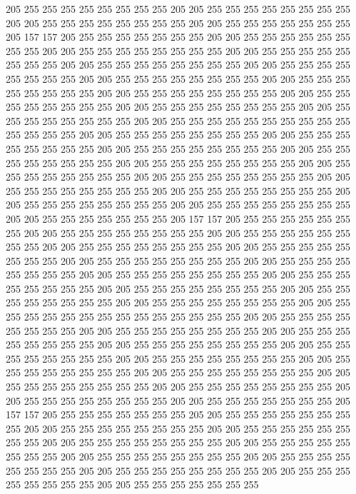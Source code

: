 205 255 255 255 255 255 255 255 255 205 205 255 255 255 255 255 255 255 255 205
205 255 255 255 255 255 255 255 255 205 205 255 255 255 255 255 255 255 205 157
157 205 255 255 255 255 255 255 255 205 205 255 255 255 255 255 255 255 255 205
205 255 255 255 255 255 255 255 255 205 205 255 255 255 255 255 255 255 255 205
205 255 255 255 255 255 255 255 255 205 205 255 255 255 255 255 255 255 255 205
205 255 255 255 255 255 255 255 255 205 205 255 255 255 255 255 255 255 255 205
205 255 255 255 255 255 255 255 255 205 205 255 255 255 255 255 255 255 255 205
205 255 255 255 255 255 255 255 255 205 205 255 255 255 255 255 255 255 255 205
205 255 255 255 255 255 255 255 255 255 255 255 255 255 255 205 205 255 255 255
255 255 255 255 255 205 205 255 255 255 255 255 255 255 255 205 205 255 255 255
255 255 255 255 255 205 205 255 255 255 255 255 255 255 255 205 205 255 255 255
255 255 255 255 255 205 205 255 255 255 255 255 255 255 255 205 205 255 255 255
255 255 255 255 255 205 205 255 255 255 255 255 255 255 255 205 205 255 255 255
255 255 255 255 255 205 205 255 255 255 255 255 255 255 255 205 205 255 255 255
255 255 255 255 255 205 205 255 255 255 255 255 255 255 205 157 157 205 255 255
255 255 255 255 255 205 205 255 255 255 255 255 255 255 255 205 205 255 255 255
255 255 255 255 255 205 205 255 255 255 255 255 255 255 255 205 205 255 255 255
255 255 255 255 255 205 205 255 255 255 255 255 255 255 255 205 205 255 255 255
255 255 255 255 255 205 205 255 255 255 255 255 255 255 255 205 205 255 255 255
255 255 255 255 255 205 205 255 255 255 255 255 255 255 255 205 205 255 255 255
255 255 255 255 255 205 205 255 255 255 255 255 255 255 255 205 205 255 255 255
255 255 255 255 255 255 255 255 255 255 255 205 205 255 255 255 255 255 255 255
255 205 205 255 255 255 255 255 255 255 255 205 205 255 255 255 255 255 255 255
255 205 205 255 255 255 255 255 255 255 255 205 205 255 255 255 255 255 255 255
255 205 205 255 255 255 255 255 255 255 255 205 205 255 255 255 255 255 255 255
255 205 205 255 255 255 255 255 255 255 255 205 205 255 255 255 255 255 255 255
255 205 205 255 255 255 255 255 255 255 255 205 205 255 255 255 255 255 255 255
255 205 205 255 255 255 255 255 255 255 205 157 157 205 255 255 255 255 255 255
255 205 205 255 255 255 255 255 255 255 255 205 205 255 255 255 255 255 255 255
255 205 205 255 255 255 255 255 255 255 255 205 205 255 255 255 255 255 255 255
255 205 205 255 255 255 255 255 255 255 255 205 205 255 255 255 255 255 255 255
255 205 205 255 255 255 255 255 255 255 255 205 205 255 255 255 255 255 255 255
255 205 205 255 255 255 255 255 255 255 255 205 205 255 255 255 255 255 255 255
